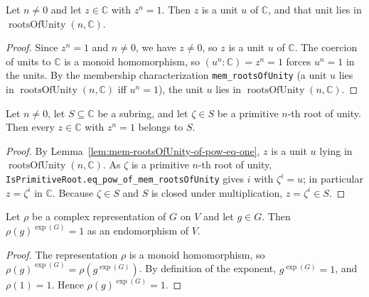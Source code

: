\begin{lemma}
    \label{lem:mem-rootsOfUnity-of-pow-eq-one}
    \leanok
    Let $n \neq 0$ and let $z \in \mathbb{C}$ with $z^n = 1$. Then $z$ is a unit
    $u$ of $\mathbb{C}$, and that unit lies in
    $\operatorname{rootsOfUnity}(n, \mathbb{C})$.
\end{lemma}
\begin{proof}
    Since $z^n = 1$ and $n \neq 0$, we have $z \neq 0$, so $z$ is a unit $u$ of
    $\mathbb{C}$. The coercion of units to $\mathbb{C}$ is a monoid homomorphism,
    so $(u^n : \mathbb{C}) = z^n = 1$ forces $u^n = 1$ in the units. By the
    membership characterization \texttt{mem\_rootsOfUnity} (a unit $u$ lies in
    $\operatorname{rootsOfUnity}(n, \mathbb{C})$ iff $u^n = 1$), the unit $u$ lies
    in $\operatorname{rootsOfUnity}(n, \mathbb{C})$.
\end{proof}

\begin{lemma}
    \label{lem:rootsOfUnity-mem}
    \leanok
    Let $n \neq 0$, let $S \subseteq \mathbb{C}$ be a subring, and let
    $\zeta \in S$ be a primitive $n$-th root of unity. Then every $z \in
    \mathbb{C}$ with $z^n = 1$ belongs to $S$.
\end{lemma}
\begin{proof}
    By Lemma~\ref{lem:mem-rootsOfUnity-of-pow-eq-one}, $z$ is a unit $u$ lying in
    $\operatorname{rootsOfUnity}(n, \mathbb{C})$. As $\zeta$ is a primitive $n$-th
    root of unity, \texttt{IsPrimitiveRoot.eq\_pow\_of\_mem\_rootsOfUnity} gives
    $i$ with $\zeta^i = u$; in particular $z = \zeta^i$ in $\mathbb{C}$. Because
    $\zeta \in S$ and $S$ is closed under multiplication, $z = \zeta^i \in S$.
\end{proof}

\begin{lemma}
    \label{lem:rho-pow-exponent}
    \leanok
    Let $\rho$ be a complex representation of $G$ on $V$ and let $g \in G$. Then
    $\rho(g)^{\exp(G)} = 1$ as an endomorphism of $V$.
\end{lemma}
\begin{proof}
    The representation $\rho$ is a monoid homomorphism, so
    $\rho(g)^{\exp(G)} = \rho(g^{\exp(G)})$. By definition of the exponent,
    $g^{\exp(G)} = 1$, and $\rho(1) = 1$. Hence $\rho(g)^{\exp(G)} = 1$.
\end{proof}

